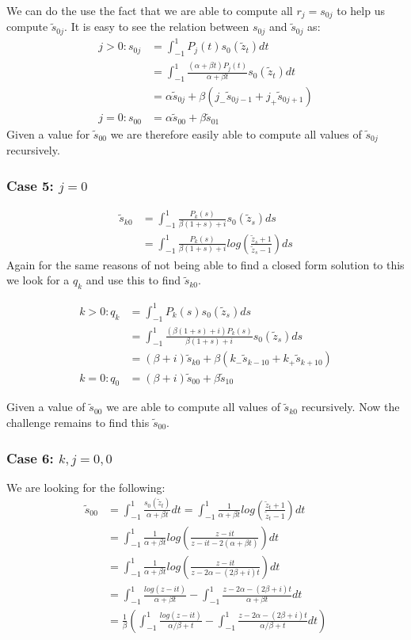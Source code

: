 \documentclass{article}
\begin{document}
We can do the use the fact that we are able to compute all $r_j=s_{0j}$ to help us compute $\tilde{s}_{0j}$.
It is easy to see the relation between $s_{0j}$ and $\tilde{s}_{0j}$ as:
\begin{align}
    j>0 : s_{0j}&=\int_{-1}^1P_j(t)s_0(\tilde{z}_t)dt\\
    &=\int_{-1}^1\frac{(\alpha+\beta t)P_j(t)}{\alpha+\beta t}s_0(\tilde{z}_t)dt\\
    &=\alpha \tilde{s}_{0j} + \beta(j_-\tilde{s}_{0j-1}+j_+\tilde{s}_{0j+1})\\
    j=0 : s_{00}&=\alpha\tilde{s}_{00}+\beta\tilde{s}_{01}
\end{align}
Given a value for $\tilde{s}_{00}$ we are therefore easily able to compute all values of $\tilde{s}_{0j}$ recursively.

\subsubsection{Case 5: $j=0$}
\begin{align}
    \tilde{s}_{k0} &= \int_{-1}^1\frac{P_k(s)}{\beta(1+s)+i}s_0(\tilde{z}_s)ds\\
    &= \int_{-1}^1\frac{P_k(s)}{\beta(1+s)+i}log(\frac{\tilde{z}_s+1}{\tilde{z}_s-1})ds
\end{align}
Again for the same reasons of not being able to find a closed form solution to this we look for a $q_k$ and use this to find $\tilde{s}_{k0}$.

\begin{align}
    k>0 : q_k &= \int_{-1}^1P_k(s)s_0(\tilde{z}_s)ds\\
    &= \int_{-1}^1\frac{(\beta(1+s)+i)P_k(s)}{\beta(1+s)+i}s_0(\tilde{z}_s)ds\\
    &= (\beta+i)\tilde{s}_{k0} + \beta(k_-\tilde{s}_{k-10}+k_+\tilde{s}_{k+10})\\
    k=0 : q_0 &= (\beta+i)\tilde{s}_{00}+\beta\tilde{s}_{10}
\end{align}

Given a value of $\tilde{s}_{00}$ we are able to compute all values of $\tilde{s}_{k0}$ recursively.
Now the challenge remains to find this $\tilde{s}_{00}$.

\subsubsection{Case 6: $k,j=0,0$}
We are looking for the following:
\begin{align}
    \tilde{s}_{00}&=\int_{-1}^1\frac{s_0(\tilde{z}_t)}{\alpha+\beta t}dt=\int_{-1}^1\frac{1}{\alpha+\beta t}log(\frac{\tilde{z}_t+1}{\tilde{z}_t-1})dt\\
    &=\int_{-1}^1\frac{1}{\alpha+\beta t}log(\frac{z-it}{z-it-2(\alpha+\beta t)})dt\\
    &=\int_{-1}^1\frac{1}{\alpha+\beta t}log(\frac{z-it}{z-2\alpha-(2\beta+i)t})dt\\
    &=\int_{-1}^1\frac{log(z-it)}{\alpha+\beta t}-\int_{-1}^1\frac{z-2\alpha-(2\beta+i)t}{\alpha+\beta t}dt\\
    &=\frac{1}{\beta}(\int_{-1}^1\frac{log(z-it)}{\alpha/\beta+ t}-\int_{-1}^1\frac{z-2\alpha-(2\beta+i)t}{\alpha/\beta+t}dt)
\end{align}
\end{document}
